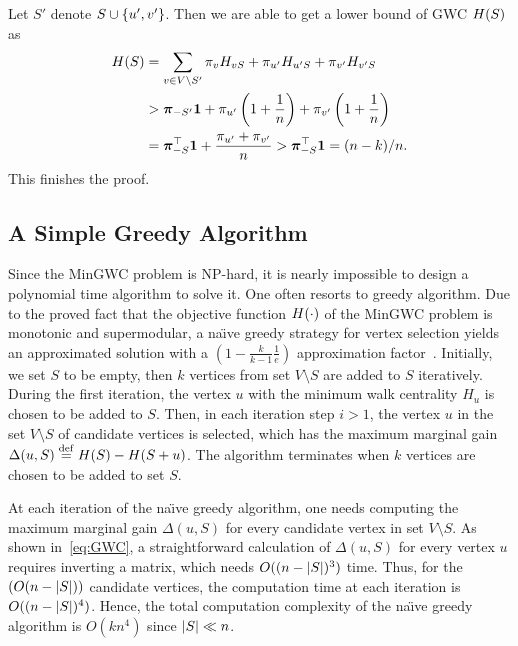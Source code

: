 \documentclass[10pt,twocolumn,twoside]{IEEEtran}
\begin{document}
\begin{IEEEproof}
    Let \(S'\) denote \(S\cup\left\{u',v' \right\}\). Then we are able to get a lower bound of GWC $H(S)$ as
    \begin{align*}
        H(S) & =\sum_{v\in V\setminus S'}\pi_vH_{vS}+\pi_{u'}H_{u'S}+\pi_{v'}H_{v'S}            \\
                 & >\boldsymbol{\pi}_{-S'}\boldsymbol{1}+\pi_{u'}\left( 1+\frac{1}{n} \right)+\pi_{v'}\left( 1+\frac{1}{n} \right) \\
                 & =\boldsymbol{\pi}_{-S}^\top\boldsymbol{1}+\frac{\pi_{u'}+\pi_{v'}}n
        >\boldsymbol{\pi}_{-S}^\top\boldsymbol{1}=(n-k)/n.
    \end{align*}
    This finishes the proof.
\end{IEEEproof}

\subsection{A Simple Greedy Algorithm}

Since the MinGWC problem is NP-hard, it is nearly impossible to design a polynomial time algorithm to solve it. One often resorts to greedy algorithm. Due to the proved fact that the objective function \(H(\cdot)\) of  the MinGWC problem is monotonic and supermodular, a na\"{\i}ve greedy strategy for vertex selection yields an approximated   solution  with a $(1-\frac{k}{k-1}\frac{1}{e})$ approximation factor~\cite{NeWoFi78}. Initially, we set $S$ to be empty, then $k$ vertices from set $V \setminus S$ are added to $S$ iteratively. During the first iteration, the vertex $u$ with the minimum walk centrality $H_u$ is chosen to be added to $S$. Then, in each iteration step $i>1$, the vertex $u$ in the set $V \setminus S$ of candidate vertices is selected, which has the maximum marginal gain $\Delta(u,S) \stackrel{\mathrm{def}}{=} H(S)-H(S+u)$.  The algorithm terminates when $k$ vertices are chosen to be added to set $S$.

At each iteration of the na\"{\i}ve greedy algorithm, one needs computing the maximum marginal gain $\Delta(u,S)$ for every candidate vertex in set $V \setminus S$. As shown in~\eqref{eq:GWC}, a straightforward calculation of  $\Delta(u,S)$ for every vertex \(u\) requires inverting a matrix, which needs $O((n-\left|S \right|)^3)$ time.  Thus, for the $(O(n-\left|S \right|))$ candidate vertices, the computation time at each iteration is $O((n-\left|S \right|)^4)$. Hence, the total computation complexity of the na\"{\i}ve greedy algorithm is \(O(kn^4)\) since $\left|S \right| \ll n$.
\end{document}
